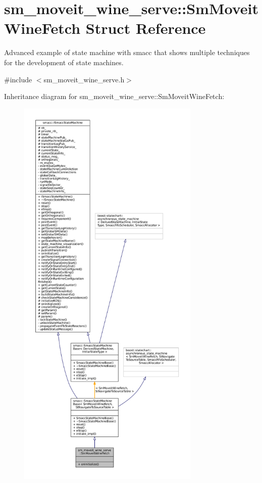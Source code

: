 \hypertarget{structsm__moveit__wine__serve_1_1SmMoveitWineFetch}{}\section{sm\+\_\+moveit\+\_\+wine\+\_\+serve\+:\+:Sm\+Moveit\+Wine\+Fetch Struct Reference}
\label{structsm__moveit__wine__serve_1_1SmMoveitWineFetch}


Advanced example of state machine with smacc that shows multiple techniques for the development of state machines.  




{\ttfamily \#include $<$sm\+\_\+moveit\+\_\+wine\+\_\+serve.\+h$>$}



Inheritance diagram for sm\+\_\+moveit\+\_\+wine\+\_\+serve\+:\+:Sm\+Moveit\+Wine\+Fetch\+:
\nopagebreak
\begin{figure}[H]
\begin{center}
\leavevmode
\includegraphics[height=550pt]{structsm__moveit__wine__serve_1_1SmMoveitWineFetch__inherit__graph}
\end{center}
\end{figure}



